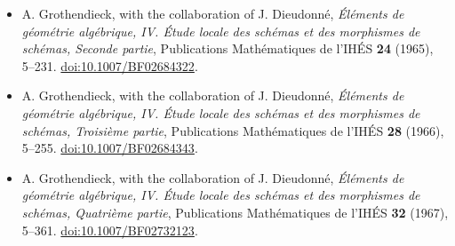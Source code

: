 \documentclass[10pt,a4paper]{article}
\begin{document}
\begin{itemize}
\item A. Grothendieck, with the collaboration of J. Dieudonn\'e, \emph{\'El\'ements de g\'eom\'etrie alg\'ebrique, IV. \'Etude locale des sch\'emas et des morphismes de sch\'emas, Seconde partie}, Publications Math\'ematiques de l'IH\'ES \textbf{24} (1965), 5--231. \href{https://www.numdam.org/articles/10.1007/BF02684322/}{doi:10.1007/BF02684322}.
\item A. Grothendieck, with the collaboration of J. Dieudonn\'e, \emph{\'El\'ements de g\'eom\'etrie alg\'ebrique, IV. \'Etude locale des sch\'emas et des morphismes de sch\'emas, Troisi\`eme partie}, Publications Math\'ematiques de l'IH\'ES \textbf{28} (1966), 5--255. \href{https://www.numdam.org/articles/10.1007/BF02684343/}{doi:10.1007/BF02684343}.
\item A. Grothendieck, with the collaboration of J. Dieudonn\'e, \emph{\'El\'ements de g\'eom\'etrie alg\'ebrique, IV. \'Etude locale des sch\'emas et des morphismes de sch\'emas, Quatri\`eme partie}, Publications Math\'ematiques de l'IH\'ES \textbf{32} (1967), 5--361. \href{https://www.numdam.org/articles/10.1007/BF02732123/}{doi:10.1007/BF02732123}.
\end{itemize}
\par{}
\end{document}
